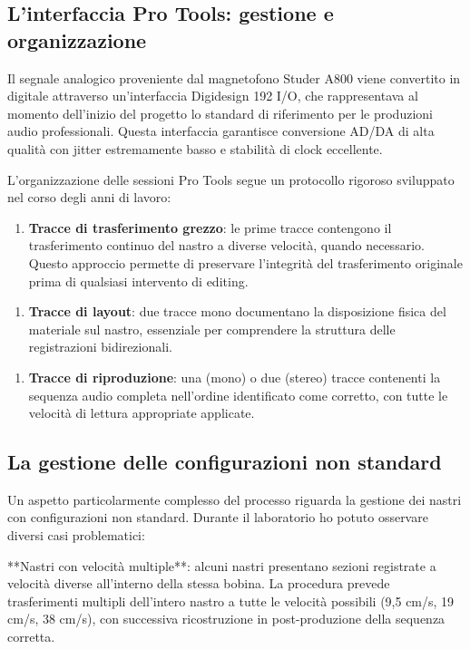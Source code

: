 \subsection{L'interfaccia Pro Tools: gestione e organizzazione}
Il segnale analogico proveniente dal magnetofono Studer A800 viene convertito in digitale attraverso un'interfaccia Digidesign 192 I/O, che rappresentava al momento dell'inizio del progetto lo standard di riferimento per le produzioni audio professionali. Questa interfaccia garantisce conversione AD/DA di alta qualità con jitter estremamente basso e stabilità di clock eccellente.

L'organizzazione delle sessioni Pro Tools segue un protocollo rigoroso sviluppato nel corso degli anni di lavoro:

\begin{enumerate}
    \item \textbf{Tracce di trasferimento grezzo}: le prime tracce contengono il trasferimento continuo del nastro a diverse velocità, quando necessario. Questo approccio permette di preservare l'integrità del trasferimento originale prima di qualsiasi intervento di editing.
\end{enumerate}

\begin{enumerate}
    \item \textbf{Tracce di layout}: due tracce mono documentano la disposizione fisica del materiale sul nastro, essenziale per comprendere la struttura delle registrazioni bidirezionali.
\end{enumerate}

\begin{enumerate}
    \item \textbf{Tracce di riproduzione}: una (mono) o due (stereo) tracce contenenti la sequenza audio completa nell'ordine identificato come corretto, con tutte le velocità di lettura appropriate applicate\cite[p. 173]{Bernardini2007recoveringgia}.
\end{enumerate}
\subsection{La gestione delle configurazioni non standard}
Un aspetto particolarmente complesso del processo riguarda la gestione dei nastri con configurazioni non standard. Durante il laboratorio ho potuto osservare diversi casi problematici:

**Nastri con velocità multiple**: alcuni nastri presentano sezioni registrate a velocità diverse all'interno della stessa bobina. La procedura prevede trasferimenti multipli dell'intero nastro a tutte le velocità possibili (9,5 cm/s, 19 cm/s, 38 cm/s), con successiva ricostruzione in post-produzione della sequenza corretta.

